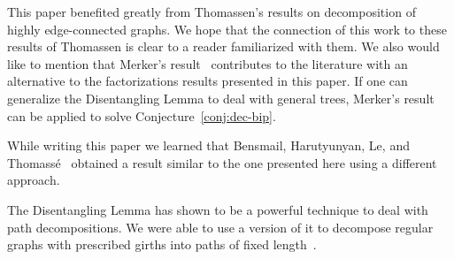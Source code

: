 \documentclass[12pt,reqno,a4paper]{amsart}
\begin{document}
This paper benefited greatly from Thomassen's results on decomposition of highly edge-connected graphs.
We hope that the connection of this work to these results of Thomassen  
is clear to a reader familiarized with them.
We also would like to mention that Merker's result~\cite{Me15+} 
contributes to the literature with an alternative to the factorizations results presented in this paper.
%
If one can generalize the Disentangling Lemma to deal with general trees, 
 Merker's result can be applied to solve Conjecture~\ref{conj:dec-bip}.

While writing this paper we learned that 
Bensmail, Harutyunyan, Le, and Thomass{\'e}~\cite{BensmailHLT15+} obtained a result similar to the one presented 
here using a different approach.

The Disentangling Lemma has shown to be a powerful technique to deal with path decompositions.
We were able to use a version of it to decompose regular graphs with prescribed girths into paths of fixed length~\cite{BoMoOsWa15+reg}.


\end{document}
